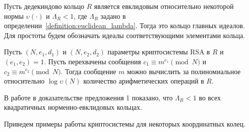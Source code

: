 \documentclass[_00_autoref.tex]{subfiles}
\begin{document}
\begin{theorem}
    Пусть дедекиндово кольцо $R$ является евклидовым относительно некоторой нормы $\upsilon(\cdot)$ и $\Lambda_{R} < 1$, где $\Lambda_{R}$ задано в определении~\ref{definition:euclidean_lambda}.
    Тогда это кольцо главных идеалов.
    Для простоты будем обозначать идеалы соответствующими элементами кольца.

    Пусть $(N, e_1, d_1)$ и $(N, e_2, d_2)$ параметры криптосистемы RSA в $R$ и $(e_1, e_2) = 1$.
    Пусть перехвачены сообщения $c_1 \equiv m^{e_1} \pmod{N}$ и $c_2 \equiv m^{e_2} \pmod{N}$.
    Тогда сообщение $m$ можно вычислить за полиномиальное относительно $\log \upsilon(N)$ количество арифметических операций в $R$.
\end{theorem}

\begin{remark}
    В работе \cite{source:Vaskouski_CSIST} в доказательстве предложения 1 показано, что $\Lambda_{R} < 1$ во всех квадратичных норменно-евклидовых кольцах.
\end{remark}

Приведем примеры работы криптосистемы для некоторых координатных колец.
\end{document}
